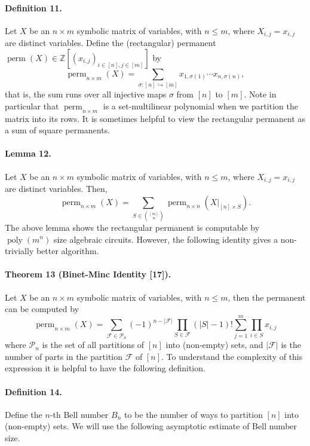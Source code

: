 \paragraph{Definition 11.} Let $X$ be an $n\times m$ symbolic matrix of variables, with $n\le m$, where $X_{i,j}=x_{i,j}$ are distinct variables. Define the (rectangular) permanent $\operatorname{perm}(X)\in\mathbb Z[(x_{i,j})_{i\in[n],j\in[m]}]$ by
\[\operatorname{perm}_{n\times m}(X)=\sum_{\sigma:[n]\hookrightarrow[m]}x_{1,\sigma(1)}\cdots x_{n,\sigma(n)},\]
that is, the sum runs over all injective maps $\sigma$ from $[n]$ to $[m]$.
Note in particular that $\operatorname{perm}_{n\times m}$ is a set-multilinear polynomial when we partition the matrix into its rows.
It is sometimes helpful to view the rectangular permanent as a sum of square permanents.
\paragraph{Lemma 12.} Let $X$ be an $n\times m$ symbolic matrix of variables, with $n\le m$, where $X_{i,j}=x_{i,j}$ are distinct variables. Then,
\[\operatorname{perm}_{n\times m}(X)=\sum_{S\in\binom{[m]}n}\operatorname{perm}_{n\times n}(X|_{[n]\times S}).\]
The above lemma shows the rectangular permanent is computable by $\operatorname{poly}(m^n)$ size algebraic circuits. However, the following identity gives a non-trivially better algorithm.
\paragraph{Theorem 13 (Binet-Minc Identity [17]).} Let $X$ be an $n\times m$ symbolic matrix of variables, with $n\le m$, then the permanent can be computed by
\[\operatorname{perm}_{n\times m}(X)=\sum_{\mathcal F\in\mathcal P_n}(-1)^{n-|\mathcal F|}\prod_{S\in\mathcal F}(|S|-1)!\sum_{j=1}^m\prod_{i\in S}x_{i,j}\]
where $\mathcal P_n$ is the set of all partitions of $[n]$ into (non-empty) sets, and $|\mathcal F|$ is the number of parts in the partition $\mathcal F$ of $[n]$.
To understand the complexity of this expression it is helpful to have the following definition.
\paragraph{Definition 14.} Define the $n$-th Bell number $B_n$ to be the number of ways to partition $[n]$ into (non-empty) sets.
We will use the following asymptotic estimate of Bell number size.
